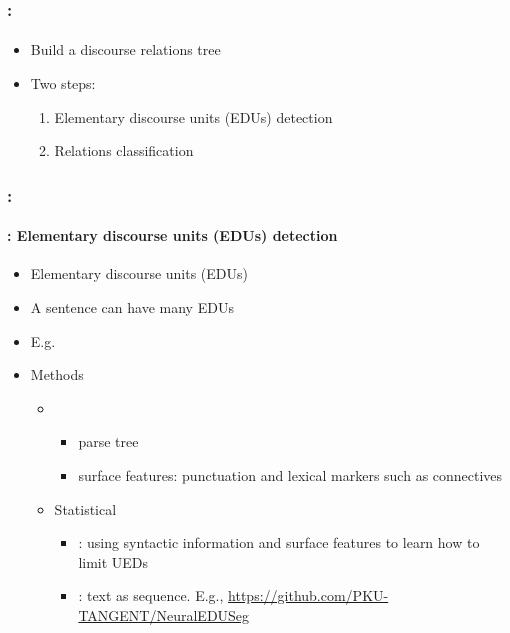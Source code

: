 \documentclass[xcolor=table]{beamer}
\begin{document}
\begin{frame}
	\frametitle{\insertshortsubtitle: \insertsection}
	\framesubtitle{\insertsubsection}
	
	\begin{itemize}
		\item Build a discourse relations tree
		\item Two steps: 
		\begin{enumerate}
			\item Elementary discourse units (EDUs) detection
			\item Relations classification
		\end{enumerate}
	\end{itemize}

	\begin{center}
	\end{center}
	
\end{frame}

\begin{frame}
	\frametitle{\insertshortsubtitle: \insertsection}
	\framesubtitle{\insertsubsection: Elementary discourse units (EDUs) detection}
	
	\begin{itemize}
		\item Elementary discourse units (EDUs)
		\item A sentence can have many EDUs 
		\item E.g. 
		\item Methods 
		\begin{itemize}
			\item {}
			\begin{itemize}
				\item parse tree
				\item surface features: punctuation and lexical markers such as connectives
			\end{itemize}
			\item Statistical
			\begin{itemize}
				\item {}: using syntactic information and surface features to learn how to limit UEDs
				\item {}: text as sequence. E.g., \url{https://github.com/PKU-TANGENT/NeuralEDUSeg}
			\end{itemize}
		\end{itemize}
	\end{itemize}
	
\end{frame}
\end{document}
